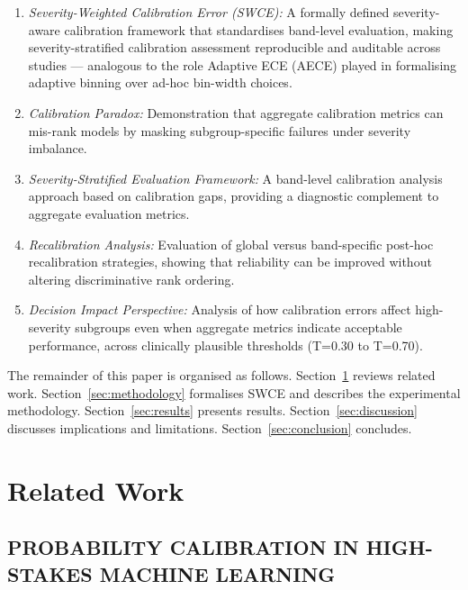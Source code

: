 \documentclass{ieeeaccess}
\begin{document}
\begin{enumerate}
  \item \textit{Severity-Weighted Calibration Error (SWCE):} A formally defined severity-aware calibration framework that standardises band-level evaluation, making severity-stratified calibration assessment reproducible and auditable across studies — analogous to the role Adaptive ECE (AECE) \cite{b10} played in formalising adaptive binning over ad-hoc bin-width choices.

  \item \textit{Calibration Paradox:} Demonstration that aggregate calibration metrics can mis-rank models by masking subgroup-specific failures under severity imbalance.

  \item \textit{Severity-Stratified Evaluation Framework:} A band-level calibration analysis approach based on calibration gaps, providing a diagnostic complement to aggregate evaluation metrics.

  \item \textit{Recalibration Analysis:} Evaluation of global versus band-specific post-hoc recalibration strategies, showing that reliability can be improved without altering discriminative rank ordering.

  \item \textit{Decision Impact Perspective:} Analysis of how calibration errors affect high-severity subgroups even when aggregate metrics indicate acceptable performance, across clinically plausible thresholds (T=0.30 to T=0.70).
\end{enumerate}

The remainder of this paper is organised as follows. Section~\ref{sec:related} reviews related work. Section~\ref{sec:methodology} formalises SWCE and describes the experimental methodology. Section~\ref{sec:results} presents results. Section~\ref{sec:discussion} discusses implications and limitations. Section~\ref{sec:conclusion} concludes.

\section{Related Work}
\label{sec:related}

\subsection{PROBABILITY CALIBRATION IN HIGH-STAKES MACHINE LEARNING}
\end{document}

